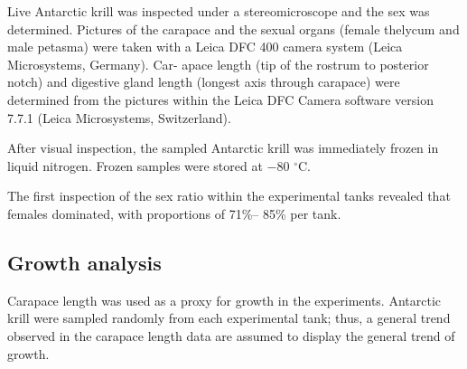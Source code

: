 Live Antarctic krill was inspected under a stereomicroscope and the sex was determined. Pictures of the carapace and the sexual organs (female thelycum and male petasma) were taken with a Leica DFC 400 camera system (Leica Microsystems, Germany). Car- apace length (tip of the rostrum to posterior notch) and digestive gland length (longest axis through carapace) were determined from the pictures within the Leica DFC Camera software version 7.7.1 (Leica Microsystems, Switzerland). 

After visual inspection, the sampled Antarctic krill was immediately frozen in liquid nitrogen. Frozen samples were stored at −80 $^{\circ}$C. 

The first inspection of the sex ratio within the experimental tanks revealed that females dominated, with proportions of 71\%– 85\% per tank. 

\subsection{Growth analysis} 
Carapace length was used as a proxy for growth in the experiments. Antarctic krill were sampled randomly from each experimental tank; thus, a general trend observed in the carapace length data are assumed to display the general trend of growth. 

